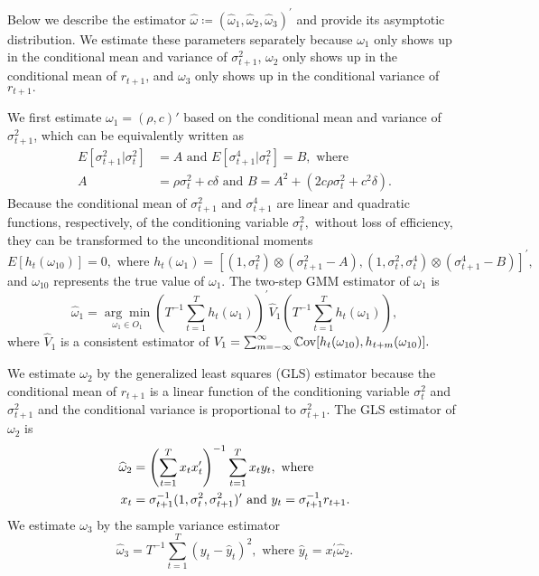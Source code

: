 \documentclass[11pt, letterpaper, twoside]{article}
\begin{document}
Below we describe the estimator $\widehat{\omega } \coloneqq (\widehat{\omega }_{1}, \widehat{\omega }_{2},\widehat{\omega }_{3})^{\prime }$ and provide its asymptotic distribution. We estimate these parameters separately because $\omega _{1}$ only shows up in the conditional mean and variance of $\sigma _{t+1}^{2}$, $\omega_{2}$ only shows up in the conditional mean of $r_{t+1}$, and $\omega _{3}$ only shows up in the conditional variance of $
r_{t+1}.$

We first estimate $\omega _{1}=(\rho,c)'$ based on the conditional mean and variance of $\sigma _{t+1}^{2}$, which can be equivalently written as 
%
\begin{align}
    E[\sigma _{t+1}^{2}|\sigma _{t}^{2}] &= A\text{ and }E[\sigma _{t+1}^{4}|\sigma _{t}^{2}]=B,\text{ where }  \nonumber \\
%
    A &= \rho \sigma _{t}^{2}+c\delta \text{ and }B=A^{2}+\left( 2c\rho \sigma _{t}^{2}+c^{2}\delta \right) .
\end{align}
%
Because the conditional mean of $\sigma _{t+1}^{2}$ and $\sigma _{t+1}^{4}$ are linear and quadratic functions, respectively, of the conditioning variable $\sigma _{t}^{2},$ without loss of efficiency, they can be transformed to the unconditional moments
%
\begin{equation}
    E[h_{t}(\omega _{10})]=0,\text{ where }h_{t}(\omega _{1})=[(1,\sigma _{t}^{2})\otimes (\sigma _{t+1}^{2}-A),(1,\sigma _{t}^{2},\sigma _{t}^{4})\otimes (\sigma _{t+1}^{4}-B)]^{\prime },
\end{equation}
%
and $\omega _{10}$ represents the true value of $\omega _{1}$. The two-step GMM estimator of $\omega _{1}$ is%
%
\begin{equation}
    \label{omega 1 est}
    \widehat{\omega }_{1}=\underset{\omega _{1}\in O_{1}}{\arg \min }\left( T^{-1}\sum_{t=1}^{T}h_{t}(\omega _{1})\right) ^{\prime }\widehat{V}_{1}\left( T^{-1}\sum_{t=1}^{T}h_{t}(\omega _{1})\right) ,
\end{equation}%
%
where $\widehat{V}_{1}$ is a consistent estimator of $V_{1}=\sum_{m=-\infty }^{\infty }\operatorname{\mathbb{C}ov}[h_{t}(\omega _{10}),h_{t+m}(\omega _{10})].$

We estimate $\omega _{2}$ by the generalized least squares (GLS) estimator because the conditional mean of $r_{t+1}$ is a linear function of the conditioning variable $\sigma _{t}^{2}$ and $\sigma _{t+1}^{2}$ and the conditional variance is proportional to $\sigma _{t+1}^{2}.$ The GLS estimator of $\omega _{2}$ is
%
\begin{align}
    \widehat{\omega }_{2} &= \left( \sum_{t=1}^{T}x_{t}x_{t}^{\prime }\right) ^{-1}\sum_{t=1}^{T}x_{t}y_{t},\text{ where }  \notag \\ 
%
    x_{t} &= \sigma _{t+1}^{-1}(1,\sigma _{t}^{2},\sigma _{t+1}^{2})^{\prime } \text{ and }y_{t}=\sigma _{t+1}^{-1}r_{t+1}.  \label{omega 2 est}
\end{align}
%
We estimate $\omega _{3}$ by the sample variance estimator
%
\begin{equation}
    \label{omega 3 est}
    \widehat{\omega }_{3}=T^{-1}\sum_{t=1}^{T}\left( y_{t}-\widehat{y}_{t}\right) ^{2},\text{ where }\widehat{y}_{t}=x_{t}^{\prime }\widehat{ \omega }_{2}.  
\end{equation}
\end{document}

